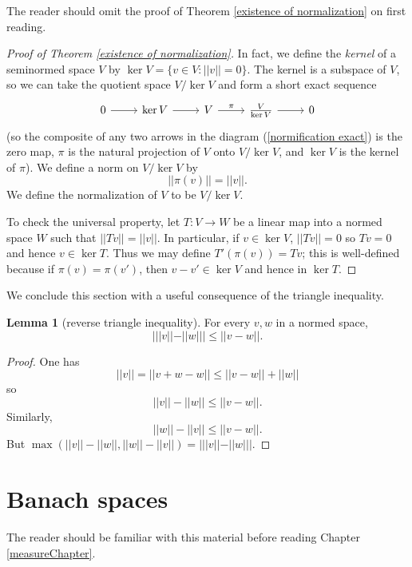 \documentclass[12pt]{book}
\newcommand{\dfn}[1]{\emph{#1}\index{#1}}
\theoremstyle{definition}
\newtheorem{lemma}[theorem]{Lemma}
\begin{document}
The reader should omit the proof of Theorem \ref{existence of normalization} on first reading.
\begin{proof}[Proof of Theorem \ref{existence of normalization}]
In fact, we define the \dfn{kernel} of a seminormed space $V$ by $\ker V = \{v \in V: ||v|| = 0\}$.
The kernel is a subspace of $V$, so we can take the quotient space $V/\ker V$ and form a short exact sequence
\begin{equation}
\label{normification exact}
\begin{tikzcd}
0 \arrow[r] & \ker V \arrow[r] & V \arrow[r,"\pi"] & \frac{V}{\ker V} \arrow[r] & 0
\end{tikzcd}
\end{equation}
(so the composite of any two arrows in the diagram (\ref{normification exact}) is the zero map, $\pi$ is the natural projection of $V$ onto $V/\ker V$, and $\ker V$ is the kernel of $\pi$).
We define a norm on $V/\ker V$ by
$$||\pi(v)|| = ||v||.$$
We define the normalization of $V$ to be $V/\ker V$.

To check the universal property, let $T: V \to W$ be a linear map into a normed space $W$ such that $||Tv|| = ||v||$.
In particular, if $v \in \ker V$, $||Tv|| = 0$ so $Tv = 0$ and hence $v \in \ker T$.
Thus we may define $T'(\pi(v)) = Tv$; this is well-defined because if $\pi(v) = \pi(v')$, then $v - v' \in \ker V$ and hence in $\ker T$.
\end{proof}

We conclude this section with a useful consequence of the triangle inequality.
\begin{lemma}[reverse triangle inequality]
For every $v, w$ in a normed space,
$$|||v|| - ||w||| \leq ||v - w||.$$
\end{lemma}
\begin{proof}
One has
$$||v|| = ||v + w - w|| \leq ||v - w|| + ||w||$$
so
$$||v|| - ||w|| \leq ||v - w||.$$
Similarly,
$$||w|| - ||v|| \leq ||v - w||.$$
But $\max(||v|| - ||w||, ||w|| - ||v||) = |||v|| - ||w|||$.
\end{proof}

\section{Banach spaces}
\label{Banach space appendix}
The reader should be familiar with this material before reading Chapter \ref{measureChapter}.
\end{document}
